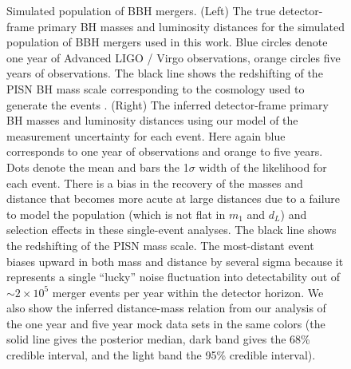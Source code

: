 \documentclass[modern]{aastex62}
\begin{document}
\begin{figure}
%
  \caption{\label{fig:m1-dL} Simulated population of \ac{BBH} mergers.  (Left)
  The true detector-frame primary \ac{BH} masses and luminosity distances for
  the simulated population of \ac{BBH} mergers used in this work.  Blue circles
  denote one year of Advanced LIGO / Virgo observations, orange circles five
  years of observations. The black line shows the redshifting of the PISN
  \ac{BH} mass scale corresponding to the cosmology used to generate the events
  \citep[TT, TE, EE + lowP + lensing + ext]{Planck2016}.  (Right) The inferred
  detector-frame primary \ac{BH} masses and luminosity distances using our model
  of the measurement uncertainty for each event.  Here again blue corresponds to
  one year of observations and orange to five years.  Dots denote the mean and
  bars the 1$\sigma$ width of the likelihood for each event.  There is a bias in
  the recovery of the masses and distance that becomes more acute at large
  distances due to a failure to model the population (which is not flat in $m_1$
  and $d_L$) and selection effects in these single-event analyses.  The black
  line shows the redshifting of the \ac{PISN} mass scale.  The most-distant
  event biases upward in both mass and distance by several sigma because it
  represents a single ``lucky'' noise fluctuation into detectability out of
  $\sim 2 \times 10^5$ merger events per year within the detector horizon.  We
  also show the inferred distance-mass relation from our analysis of the one
  year and five year mock data sets in the same colors (the solid line gives the
  posterior median, dark band gives the 68\% credible interval, and the light
  band the 95\% credible interval).}
%
\end{figure}
\end{document}
